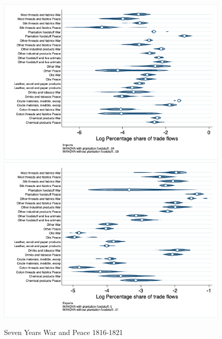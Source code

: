 \documentclass[12pt,a4paper,notitlepage,english]{article}
\begin{document}
\begin{figure}
\centering
\caption{Seven Years War and Peace 1816-1821}
\label{seven_peace1764_1777_nat_distr}
\includegraphics[scale=.4]{seven_peace1764_1777_nat_distr_I}
\includegraphics[scale=.4]{seven_peace1764_1777_nat_distr_X}
\end{figure}
\end{document}
